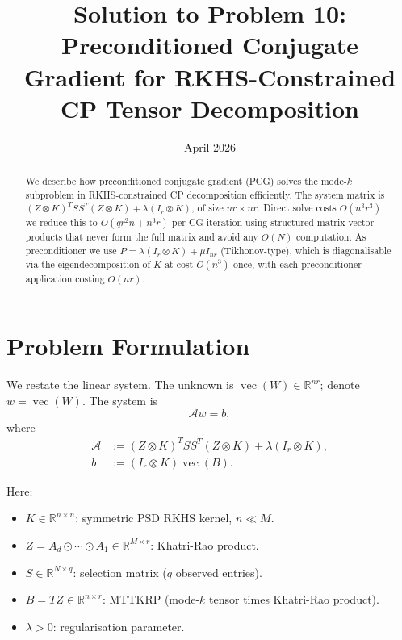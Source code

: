 \documentclass[12pt]{article}
\title{Solution to Problem 10:\\
Preconditioned Conjugate Gradient for RKHS-Constrained\\
CP Tensor Decomposition}
\author{}
\date{April 2026}
\theoremstyle{definition}
\theoremstyle{remark}
\DeclareMathOperator{\vecop}{vec}
\begin{document}
\maketitle

\begin{abstract}
We describe how preconditioned conjugate gradient (PCG) solves the mode-$k$
subproblem in RKHS-constrained CP decomposition efficiently.  The system
matrix is $(Z\otimes K)^T S S^T (Z\otimes K) + \lambda(I_r\otimes K)$, of size
$nr\times nr$.  Direct solve costs $O(n^3r^3)$; we reduce this to
$O(q r^2 n + n^3 r)$ per CG iteration using structured matrix-vector products
that never form the full matrix and avoid any $O(N)$ computation.  As
preconditioner we use $P = \lambda(I_r\otimes K) + \mu I_{nr}$
(Tikhonov-type), which is diagonalisable via the eigendecomposition of $K$
at cost $O(n^3)$ once, with each preconditioner application costing $O(nr)$.
\end{abstract}

\section{Problem Formulation}

We restate the linear system.  The unknown is $\vecop(W)\in\mathbb{R}^{nr}$;
denote $w = \vecop(W)$.  The system is
\begin{equation}\label{eq:system}
  \mathcal{A} w = b,
\end{equation}
where
\begin{align}
  \mathcal{A} &:= (Z\otimes K)^T S S^T (Z\otimes K) + \lambda(I_r\otimes K),
  \label{eq:A}\\
  b &:= (I_r\otimes K)\vecop(B). \label{eq:b}
\end{align}

Here:
\begin{itemize}
\item $K\in\mathbb{R}^{n\times n}$: symmetric PSD RKHS kernel, $n\ll M$.
\item $Z = A_d\odot\cdots\odot A_1\in\mathbb{R}^{M\times r}$: Khatri-Rao product.
\item $S\in\mathbb{R}^{N\times q}$: selection matrix ($q$ observed entries).
\item $B = TZ\in\mathbb{R}^{n\times r}$: MTTKRP (mode-$k$ tensor times
  Khatri-Rao product).
\item $\lambda > 0$: regularisation parameter.
\end{itemize}
\end{document}
